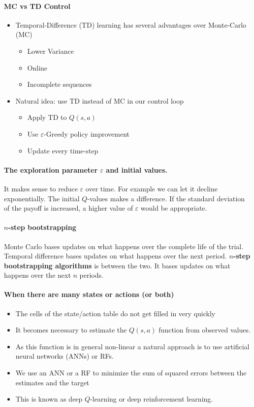 \paragraph{MC vs TD Control}
\begin{itemize}
    \item Temporal-Difference (TD) learning has several advantages over Monte-Carlo (MC)
    \begin{itemize}
        \item Lower Variance
        \item Online
        \item Incomplete sequences
    \end{itemize}
    \item Natural idea: use TD instead of MC in our control loop
    \begin{itemize}
        \item Apply TD to $Q(s, a)$
        \item Use $\varepsilon$-Greedy policy improvement
        \item Update every time-step
    \end{itemize}
\end{itemize}

\paragraph{The exploration parameter $\varepsilon$ and initial values.} It makes sense to reduce $\varepsilon$ over time. For example we can let it decline exponentially.
The initial $Q$-values makes a difference.
If the standard deviation of the payoff is increased, a higher value of $\varepsilon$ would be appropriate.

\paragraph{$n$-step bootstrapping} Monte Carlo bases updates on what happens over the complete life of the trial.
Temporal difference bases updates on what happens over the next period.
\textbf{$n$-step bootstrapping algorithms} is between the two. It bases updates on what happens over the next $n$ periods.

\paragraph{When there are many states or actions (or both)}

\begin{itemize}
    \item The cells of the state/action table do not get filled in very quickly
    \item It becomes necessary to estimate the $Q(s,a)$ function from observed values.
    \item As this function is in general non-linear a natural approach is to use artificial neural networks (ANNs) or RFs.
    \item We use an ANN or a RF to minimize the sum of squared errors between the estimates and the target
    \item This is known as deep $Q$-learning or deep reinforcement learning.
\end{itemize}


